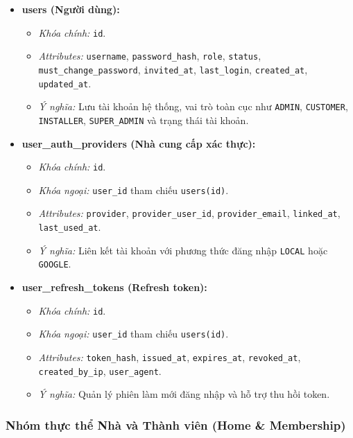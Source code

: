 \begin{itemize}
    \item \textbf{users (Người dùng):}
    \begin{itemize}
        \item \textit{Khóa chính:} \texttt{id}.
        \item \textit{Attributes:} \texttt{username}, \texttt{password\_hash}, \texttt{role}, \texttt{status}, \texttt{must\_change\_password}, \texttt{invited\_at}, \texttt{last\_login}, \texttt{created\_at}, \texttt{updated\_at}.
        \item \textit{Ý nghĩa:} Lưu tài khoản hệ thống, vai trò toàn cục như \texttt{ADMIN}, \texttt{CUSTOMER}, \texttt{INSTALLER}, \texttt{SUPER\_ADMIN} và trạng thái tài khoản.
    \end{itemize}

    \item \textbf{user\_auth\_providers (Nhà cung cấp xác thực):}
    \begin{itemize}
        \item \textit{Khóa chính:} \texttt{id}.
        \item \textit{Khóa ngoại:} \texttt{user\_id} tham chiếu \texttt{users(id)}.
        \item \textit{Attributes:} \texttt{provider}, \texttt{provider\_user\_id}, \texttt{provider\_email}, \texttt{linked\_at}, \texttt{last\_used\_at}.
        \item \textit{Ý nghĩa:} Liên kết tài khoản với phương thức đăng nhập \texttt{LOCAL} hoặc \texttt{GOOGLE}.
    \end{itemize}

    \item \textbf{user\_refresh\_tokens (Refresh token):}
    \begin{itemize}
        \item \textit{Khóa chính:} \texttt{id}.
        \item \textit{Khóa ngoại:} \texttt{user\_id} tham chiếu \texttt{users(id)}.
        \item \textit{Attributes:} \texttt{token\_hash}, \texttt{issued\_at}, \texttt{expires\_at}, \texttt{revoked\_at}, \texttt{created\_by\_ip}, \texttt{user\_agent}.
        \item \textit{Ý nghĩa:} Quản lý phiên làm mới đăng nhập và hỗ trợ thu hồi token.
    \end{itemize}
\end{itemize}

\subsubsection{Nhóm thực thể Nhà và Thành viên (Home \& Membership)}

